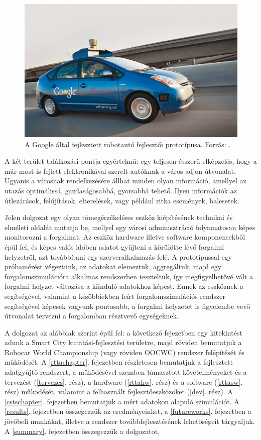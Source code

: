 \documentclass[a4paper,12pt]{report}
\begin{document}
\begin{figure}[h]
\centerline{
\includegraphics[width=6in]{img/googleauto}}
\caption{A Google által fejlesztett robotautó fejlesztői prototípusa. Forrás: \cite{googlecarimage}.}
\label{googleauto}
\end{figure}

A két terület találkozási pontja egyértelmű: egy teljesen ésszerű elképzelés, hogy a már most is fejlett elektronikával szerelt autóknak a város adjon útvonalat. Ugyanis a városnak rendelkezésére állhat minden olyan információ, amellyel az utazás optimálissá, gazdaságosabbá, gyorsabbá tehető. Ilyen információk az útlezárások, felújítások, elterelések, vagy például ritka események, balesetek. 

Jelen dolgozat egy olyan tömegérzékeléses eszköz kiépítésének technikai és elméleti oldalát mutatja be, mellyel egy városi adminisztráció folyamatosan képes monitorozni a forgalmat. Az eszköz hardware illetve software komponensekből épül fel, és képes valós időben adatot gyűjteni a körülötte lévő forgalmi helyzetről, azt továbbítani egy szerveralkalmazás felé. A prototípussal egy próbamérést végeztünk, az adatokat elemeztük, aggregáltuk, majd egy forgalomszimulációra alkalmas rendszerben teszteltük, így megfigyelhetővé vált a forgalmi helyzet változása a kiinduló adatokhoz képest. Ennek az eszköznek a segítségével, valamint a későbbiekben leírt forgalomszimulációs rendszer segítségével képesek vagyunk pontosabb, a forgalmi helyzetet is figyelembe vevő útvonalat tervezni a forgalomban résztvevő egységeknek.

A dolgozat az alábbiak szerint épül fel: a következő fejezetben egy kitekintést adunk a Smart City kutatási-fejlesztési területre, majd röviden bemutatjuk a Robocar World Championship (vagy röviden OOCWC) rendszer felépítését és működését. A \ref{rttachapter}. fejezetben részletesen bemutatjuk a fejlesztett adatgyűjtő rendszert, a működésével szemben támasztott követelményeket és a tervezést (\ref{tervezes}. rész), a hardware (\ref{rttahw}. rész) és a software (\ref{rttasw}. rész) működését, valamint a felhasznált fejlesztőeszközöket (\ref{dev}. rész). A \ref{cstschapter}. fejezetben bemutatjuk a mért adatokon alapuló szimulációt. A \ref{results}. fejezetben összegezzük az eredményeinket, a \ref{futureworks}. fejezetben a jövőbeli munkákat, illetve a rendszer továbbfejlesztésének lehetőségeit tárgyaljuk.
A \ref{summary}. fejezetben összegezzük a dolgozatot.
\end{document}
